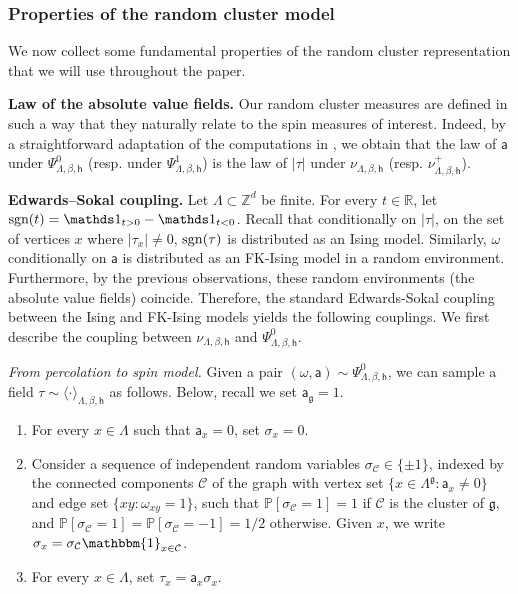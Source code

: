 \documentclass[11pt,a4paper]{article}
\numberwithin{equation}{section}
\theoremstyle{plain}
\theoremstyle{definition}
\newcommand\fg{\mathfrak{g}}
\begin{document}
\subsubsection{Properties of the random cluster model}\label{subsubsection: random cluster}


We now collect some fundamental properties of the random cluster representation that we will use throughout the paper. 

\hfill

\noindent\textbf{Law of the absolute value fields.}
Our random cluster measures are defined in such a way that they naturally relate to the spin measures of interest. 
Indeed, by a straightforward adaptation of the computations in \cite[Proposition~4.6]{gunaratnam2025supercritical}, we obtain that the law of $\mathsf{a}$ under $\Psi^0_{\Lambda,\beta,\mathsf{h}}$ (resp. under $\Psi^1_{\Lambda,\beta,\mathsf{h}}$) is the law of $|\tau|$ under $\nu_{\Lambda,\beta,\mathsf{h}}$ (resp. $\nu_{\Lambda,\beta,\mathsf{h}}^+$).




\hfill


\noindent\textbf{Edwards--Sokal coupling.} Let $\Lambda\subset \mathbb Z^d$ be finite. For every $t\in \mathbb R$, let $\textup{sgn}(t) = \mathds 1_{t> 0} - \mathds 1_{t<0}$. Recall that conditionally on $|\tau|$, on the set of vertices $x$ where $|\tau_x|\neq 0$, ${\rm sgn}(\tau)$  is distributed as an Ising model. Similarly, $\omega$ conditionally on $\mathsf a$ is distributed as an FK-Ising model in a random environment. Furthermore, by the previous observations, these random environments (the absolute value fields) coincide. Therefore, the standard Edwards-Sokal coupling between the Ising and FK-Ising models \cite[Chapter 1]{Grimmett2006RCM} yields the following couplings. We first describe the coupling between $\nu_{\Lambda,\beta,\mathsf{h}}$ and $\Psi^0_{\Lambda,\beta,\mathsf{h}}$. 

\medskip

\noindent\textit{From percolation to spin model.} 
Given a pair $(\omega,\mathsf{a})\sim \Psi^0_{\Lambda,\beta,\mathsf{h}}$, we can sample a field $\tau\sim \langle \cdot \rangle_{\Lambda,\beta,\mathsf{h}}$ as follows. Below, recall we set $\mathsf{a}_{\mathfrak{g}}=1$.
\begin{enumerate}
\item[$(i)$] For every $x\in \Lambda$ such that $\mathsf{a}_x=0$, set $\sigma_x=0$.
\item[$(ii)$] Consider a sequence of independent random variables $\sigma_{\mathcal{C}}\in \{\pm 1\}$, indexed by the connected components $\mathcal{C}$ of the graph with vertex set $\{x\in \Lambda^\fg: \mathsf{a}_x\neq 0\}$ and edge set $\{xy: \omega_{xy}=1\}$, such that $\mathbb{P}[\sigma_{\mathcal{C}}=1]=1$ if $\mathcal{C}$ is the cluster of $\fg$, and $\mathbb{P}[\sigma_{\mathcal{C}}=1]=\mathbb P[\sigma_{\mathcal{C}}=-1]=1/2$ otherwise. Given $x$, we write $\sigma_x = \sigma_{\mathcal C}\mathbbm{1}_{x \in \mathcal C}$.
\item[$(iii)$] For every $x\in \Lambda$, set $\tau_x = \mathsf{a}_x \sigma_{x}$.
\end{enumerate}
\end{document}
